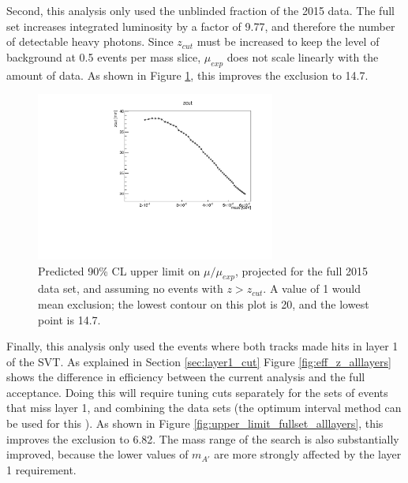 Second, this analysis only used the unblinded fraction of the 2015 data.
The full set increases integrated luminosity by a factor of 9.77, and therefore the number of detectable heavy photons.
Since $z_{cut}$ must be increased to keep the level of background at 0.5 events per mass slice, $\mu_{exp}$ does not scale linearly with the amount of data.
As shown in Figure \ref{fig:upper_limit_fullset}, this improves the exclusion to 14.7.

\begin{figure}[ht]
\begin{center}
    \includegraphics[width=0.7\textwidth,page=15,angle=-90]{vertexing/figs/golden_fullset_mres_nosignal_output}
\end{center}
\caption{Predicted 90\% CL upper limit on $\mu/\mu_{exp}$, projected for the full 2015 data set, and assuming no events with $z>z_{cut}$. A value of 1 would mean exclusion; the lowest contour on this plot is 20, and the lowest point is 14.7.}
    \label{fig:upper_limit_fullset}
\end{figure}

Finally, this analysis only used the events where both tracks made hits in layer 1 of the SVT.
As explained in Section \ref{sec:layer1_cut}
Figure \ref{fig:eff_z_alllayers} shows the difference in efficiency between the current analysis and the full acceptance.
Doing this will require tuning cuts separately for the sets of events that miss layer 1, and combining the data sets (the optimum interval method can be used for this \cite{yellin_ways_2011}).
As shown in Figure \ref{fig:upper_limit_fullset_alllayers}, this improves the exclusion to 6.82.
The mass range of the search is also substantially improved, because the lower values of $m_{A'}$ are more strongly affected by the layer 1 requirement.

